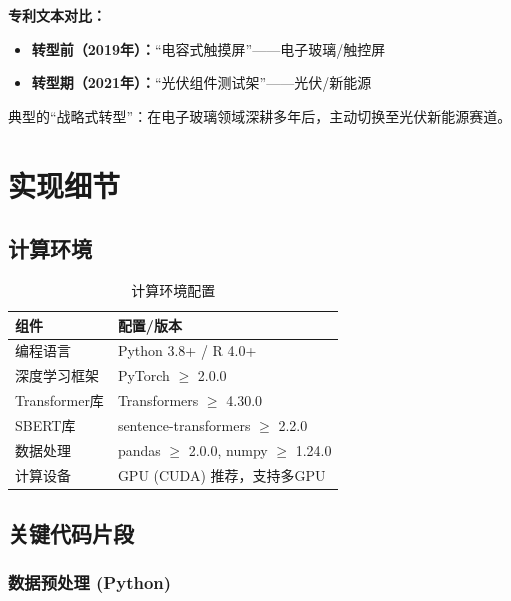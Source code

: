 \documentclass[12pt,a4paper]{article}
\theoremstyle{definition}
\begin{document}
\textbf{专利文本对比：}
\begin{itemize}
    \item \textbf{转型前（2019年）：}``电容式触摸屏''——电子玻璃/触控屏
    \item \textbf{转型期（2021年）：}``光伏组件测试架''——光伏/新能源
\end{itemize}

典型的``战略式转型''：在电子玻璃领域深耕多年后，主动切换至光伏新能源赛道。

\section{实现细节}

\subsection{计算环境}

\begin{table}[H]
    \centering
    \caption{计算环境配置}
    \label{tab:environment}
    \begin{tabular}{@{}ll@{}}
        \toprule
        \textbf{组件} & \textbf{配置/版本} \\
        \midrule
        编程语言 & Python 3.8+ / R 4.0+ \\
        深度学习框架 & PyTorch $\geq$ 2.0.0 \\
        Transformer库 & Transformers $\geq$ 4.30.0 \\
        SBERT库 & sentence-transformers $\geq$ 2.2.0 \\
        数据处理 & pandas $\geq$ 2.0.0, numpy $\geq$ 1.24.0 \\
        计算设备 & GPU (CUDA) 推荐，支持多GPU \\
        \bottomrule
    \end{tabular}
\end{table}

\subsection{关键代码片段}

\subsubsection{数据预处理 (Python)}
\end{document}
